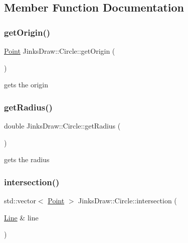\subsection{Member Function Documentation}
\mbox{\label{class_jinks_draw_1_1_circle_aca5002abc521f58555fa0fa1c55493be}} 
\subsubsection{\texorpdfstring{get\+Origin()}{getOrigin()}}
{\footnotesize\ttfamily \mbox{\hyperlink{class_jinks_draw_1_1_point}{Point}} Jinks\+Draw\+::\+Circle\+::get\+Origin (\begin{DoxyParamCaption}{ }\end{DoxyParamCaption})}



gets the origin 

\mbox{\label{class_jinks_draw_1_1_circle_a846165b5fc2a414afbfe04f6d7489fb9}} 
\subsubsection{\texorpdfstring{get\+Radius()}{getRadius()}}
{\footnotesize\ttfamily double Jinks\+Draw\+::\+Circle\+::get\+Radius (\begin{DoxyParamCaption}{ }\end{DoxyParamCaption})}



gets the radius 

\mbox{\label{class_jinks_draw_1_1_circle_aaea3c11d7267e06784145ce450be49a8}} 
\subsubsection{\texorpdfstring{intersection()}{intersection()}\hspace{0.1cm}{\footnotesize\ttfamily [1/2]}}
{\footnotesize\ttfamily std\+::vector$<$ \mbox{\hyperlink{class_jinks_draw_1_1_point}{Point}} $>$ Jinks\+Draw\+::\+Circle\+::intersection (\begin{DoxyParamCaption}\item[{\mbox{\hyperlink{class_jinks_draw_1_1_line}{Line}} \&}]{line }\end{DoxyParamCaption})}



